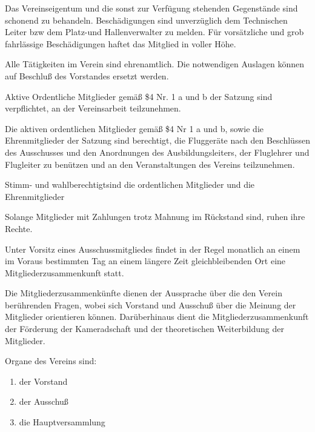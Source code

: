 \documentclass[11pt,a4paper,parskip=half]{scrartcl}
\begin{document}
\begin{contract}
\begin{multicols}{2}
    Das Vereinseigentum und die sonst zur Verfügung stehenden Gegenstände sind schonend zu behandeln.
    Beschädigungen sind unverzüglich dem Technischen Leiter bzw dem Platz-und Hallenverwalter zu melden.
    Für vorsätzliche und grob fahrlässige Beschädigungen haftet das Mitglied in voller Höhe.

    Alle Tätigkeiten im Verein sind ehrenamtlich.
    Die notwendigen Auslagen können auf Beschluß des Vorstandes ersetzt werden.

    Aktive Ordentliche Mitglieder gemäß \$4 Nr. 1 a und b der Satzung sind verpflichtet,
    an der Vereinsarbeit teilzunehmen.


    Die aktiven ordentlichen Mitglieder gemäß \$4 Nr 1 a und b,
    sowie die Ehrenmitglieder der Satzung sind berechtigt,
    die Fluggeräte nach den Beschlüssen des Ausschusses und den Anordnungen des Ausbildungsleiters,
    der Fluglehrer und Flugleiter zu benützen und an den Veranstaltungen des Vereins teilzunehmen.

    Stimm- und wahlberechtigtsind die ordentlichen Mitglieder und die Ehrenmitglieder

    Solange Mitglieder mit Zahlungen trotz Mahnung im Rückstand sind,
    ruhen ihre Rechte.

    Unter Vorsitz eines Ausschussmitgliedes findet in der Regel monatlich an einem im Voraus bestimmten Tag an einem längere Zeit gleichbleibenden Ort eine Mitgliederzusammenkunft statt.

    Die Mitgliederzusammenkünfte dienen der Aussprache über die den Verein berührenden Fragen,
    wobei sich Vorstand und Ausschuß über die Meinung der Mitglieder orientieren können.
    Darüberhinaus dient die Mitgliederzusammenkunft der Förderung der Kameradschaft und der theoretischen Weiterbildung der Mitglieder.

    Organe des Vereins sind:
    \begin{enumerate}
    \item der Vorstand
    \item der Ausschuß
    \item die Hauptversammlung
    \end{enumerate}


\end{multicols}
\end{contract}
\end{document}
